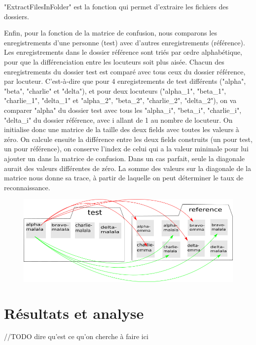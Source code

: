 \documentclass[a4paper,12pt]{article}
\begin{document}
"ExtractFilesInFolder" est la fonction qui permet d'extraire les fichiers des dossiers.

Enfin, pour la fonction de la matrice de confusion, nous comparons les enregistrements d'une personne (test) avec d'autres enregistrements (référence). Les enregistrements dans le dossier référence sont triés par ordre alphabétique, pour que la différenciation entre les locuteurs soit plus aisée. Chacun des enregistrements du dossier test est comparé avec tous ceux du dossier référence, par locuteur. C'est-à-dire que pour 4 enregistrements de test différents ("alpha", "beta", "charlie" et "delta"), et pour deux locuteurs ("alpha\_1", "beta\_1", "charlie\_1", "delta\_1" et "alpha\_2", "beta\_2", "charlie\_2", "delta\_2"), on va comparer "alpha" du dossier test avec tous les "alpha\_i", "beta\_i", "charlie\_i", "delta\_i" du dossier référence, avec i allant de 1 au nombre de locuteur.
On initialise donc une matrice de la taille des deux fields avec toutes les valeurs à zéro. On calcule ensuite la différence entre les deux fields construits (un pour test, un pour référence), on conserve l'index de celui qui a la valeur minimale pour lui ajouter un dans la matrice de confusion. Dans un cas parfait, seule la diagonale aurait des valeurs différentes de zéro.
La somme des valeurs sur la diagonale de la matrice nous donne sa trace, à partir de laquelle on peut déterminer le taux de reconnaissance.

\begin{figure}[h]
		\includegraphics[scale=0.5]{compte-rendu.png}
	\end{figure}
	
\section{Résultats et analyse}
	//TODO dire qu'est ce qu'on cherche à faire ici
\end{document}

